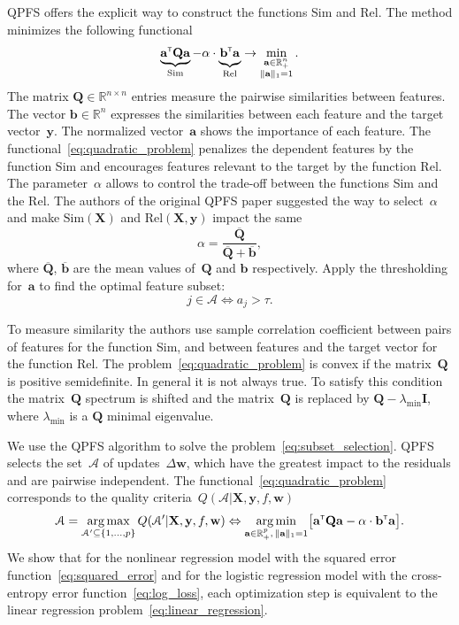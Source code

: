 \documentclass[
11pt,%
tightenlines,%
twoside,%
onecolumn,%
nofloats,%
nobibnotes,%
nofootinbib,%
superscriptaddress,%
noshowpacs,%
centertags]%
{revtex4}
\newcommand{\ba}{\mathbf{a}}
\newcommand{\bb}{\mathbf{b}}
\newcommand{\bw}{\mathbf{w}}
\newcommand{\by}{\mathbf{y}}
\newcommand{\cA}{\mathcal{A}}
\newcommand{\bQ}{\mathbf{Q}}
\newcommand{\bbR}{\mathbb{R}}
\newcommand{\bX}{\mathbf{X}}
\newcommand{\T}{{\text{\tiny\sffamily\upshape\mdseries T}}}
\newcommand{\argmin}{\mathop{\arg \min}\limits}
\newcommand{\argmax}{\mathop{\arg \max}\limits}
\begin{document}
QPFS offers the explicit way to construct the functions Sim and Rel. 
The method minimizes the following functional
\begin{equation}
\underbrace{\ba^{\T} \bQ \ba}_{\text{Sim}} - \alpha \cdot \underbrace{\vphantom{()} \mathbf{b}^{\T} \ba}_{\text{Rel}} \rightarrow \min_{\substack{\ba \in \bbR^n_+ \\ \|\ba\|_1=1}}.
\label{eq:quadratic_problem}
\end{equation}
The matrix $\bQ \in \bbR^{n \times n}$ entries measure the pairwise similarities between features. 
The vector $\mathbf{b} \in \bbR^n$ expresses the similarities between each feature and the target vector~$\by$.
The normalized vector~$\ba$ shows the importance of each feature. 
The functional~\eqref{eq:quadratic_problem} penalizes the dependent features by the function Sim and encourages features relevant to the target by the function Rel. 
The parameter~$\alpha$ allows to control the trade-off between the functions Sim and the Rel.
The authors of the original QPFS paper suggested the way to select~$\alpha$ and make $\text{Sim}(\bX)$ and $\text{Rel}(\bX, \by)$ impact the same
\begin{equation*}
\alpha = \frac{\overline{\bQ}}{\overline{\bQ} + \overline{\bb}},
\end{equation*}
where $\overline{\bQ}$, $\overline{\bb}$ are the mean values of~$\bQ$ and $\bb$ respectively.
Apply the thresholding for~$\ba$ to find the optimal feature subset:
\[
j \in \mathcal{A} \Leftrightarrow a_j > \tau.
\]

To measure similarity the authors use sample correlation coefficient between pairs of features for the function Sim, and between features and the target vector for the function Rel.
The problem~\eqref{eq:quadratic_problem} is convex if the matrix~$\bQ$ is positive semidefinite. In general it is not always true. 
To satisfy this condition the matrix~$\bQ$ spectrum is shifted and the matrix~$\bQ$ is replaced by $\bQ - \lambda_{\text{min}} \mathbf{I}$, where $\lambda_{\text{min}} $ is a $\bQ$ minimal eigenvalue.

We use the QPFS algorithm to solve the problem~\eqref{eq:subset_selection}.
QPFS selects the set~$\cA$ of updates~$\Delta \bw$, which have the greatest impact to the residuals and are pairwise independent.
The functional~\eqref{eq:quadratic_problem} corresponds to the quality criteria~$Q(\cA | \bX, \by, f, \bw)$
\begin{equation}
\cA = \argmax_{\cA' \subseteq \{1, \dots, p\}} Q(\cA' | \bX, \by, f, \bw) \Leftrightarrow \argmin_{\ba  \in \bbR^p_+, \, \|\ba\|_1=1} \bigl[\ba^{\T} \bQ \ba - \alpha \cdot \mathbf{b}^{\T} \ba \bigr].
\end{equation}
We show that for the nonlinear regression model with the squared error function~\eqref{eq:squared_error} and for the logistic regression model with the cross-entropy error function~\eqref{eq:log_loss}, each optimization step is equivalent to the linear regression problem~\eqref{eq:linear_regression}.
\end{document}

